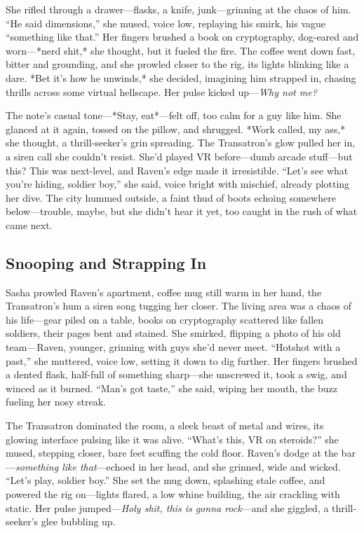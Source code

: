 \documentclass[12pt]{book}
\begin{document}
She rifled through a drawer—flasks, a knife, junk—grinning at the chaos of him. “He said dimensions,” she mused, voice low, replaying his smirk, his vague “something like that.” Her fingers brushed a book on cryptography, dog-eared and worn—*nerd shit,* she thought, but it fueled the fire. The coffee went down fast, bitter and grounding, and she prowled closer to the rig, its lights blinking like a dare. *Bet it’s how he unwinds,* she decided, imagining him strapped in, chasing thrills across some virtual hellscape. Her pulse kicked up—\textit{Why not me?}

The note’s casual tone—*Stay, eat*—felt off, too calm for a guy like him. She glanced at it again, tossed on the pillow, and shrugged. *Work called, my ass,* she thought, a thrill-seeker’s grin spreading. The Transatron’s glow pulled her in, a siren call she couldn’t resist. She’d played VR before—dumb arcade stuff—but this? This was next-level, and Raven’s edge made it irresistible. “Let’s see what you’re hiding, soldier boy,” she said, voice bright with mischief, already plotting her dive. The city hummed outside, a faint thud of boots echoing somewhere below—trouble, maybe, but she didn’t hear it yet, too caught in the rush of what came next.

\subsection{Snooping and Strapping In}

Sasha prowled Raven’s apartment, coffee mug still warm in her hand, the Transatron’s hum a siren song tugging her closer. The living area was a chaos of his life—gear piled on a table, books on cryptography scattered like fallen soldiers, their pages bent and stained. She smirked, flipping a photo of his old team—Raven, younger, grinning with guys she’d never meet. “Hotshot with a past,” she muttered, voice low, setting it down to dig further. Her fingers brushed a dented flask, half-full of something sharp—she unscrewed it, took a swig, and winced as it burned. “Man’s got taste,” she said, wiping her mouth, the buzz fueling her nosy streak.

The Transatron dominated the room, a sleek beast of metal and wires, its glowing interface pulsing like it was alive. “What’s this, VR on steroids?” she mused, stepping closer, bare feet scuffing the cold floor. Raven’s dodge at the bar—\textit{something like that}—echoed in her head, and she grinned, wide and wicked. “Let’s play, soldier boy.” She set the mug down, splashing stale coffee, and powered the rig on—lights flared, a low whine building, the air crackling with static. Her pulse jumped—\textit{Holy shit, this is gonna rock}—and she giggled, a thrill-seeker’s glee bubbling up.
\end{document}
